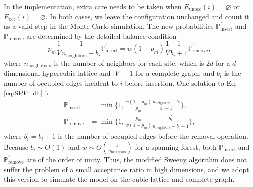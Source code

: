 In the implementation, extra care needs to be taken when $E_{\text{unocc}}(i) = \varnothing$ or $E_{\text{occ}}(i) = \varnothing$.
In both cases, we leave the configuration unchanged and count it as a valid step in the Monte Carlo simulation.
The new probabilities $\mathbb{P}^\prime_{\text{insert}}$ and $\mathbb{P}^\prime_{\text{remove}}$ are determined by the 
detailed balance condition
\begin{equation}\label{eq:SPF_db}
  p_m \frac{1}{V} \frac{1}{n_{\text{neighbors}}  - b_i} \mathbb{P}^\prime_{\text{insert}} =
  w (1-p_m) \frac{1}{V} \frac{1}{b_i+1} \mathbb{P}^\prime_{\text{remove}},
\end{equation}
where $n_{\text{neighobors}}$ is the number of neighbors for each site, which is $2d$ for a $d$-dimensional hypercubic
lattice and $|V|-1$ for a complete graph, and $b_i$ is the number of occupied edges incident to $i$ before insertion. 
One solution to Eq.\eqref{eq:SPF_db} is
\begin{equation}
\begin{aligned}
\mathbb{P}^\prime_{\text{insert}}  &= \min\{1, \frac{w(1-p_m)}{p_m}\frac{n_{\text{neighbors}}-b_i}{b_i+1}\}, \\
\mathbb{P}^\prime_{\text{remove}}  &= \min\{1, \frac{p_m}{w(1-p_m)}\frac{b_i^{\prime}}{n_{\text{neighbors}}-b_i^{\prime}+1}\},
\end{aligned}
\end{equation}
where $b^\prime_i = b_i + 1$ is the number of occupied edges before the removal operation. Because $b_i \sim O(1)$ and $w\sim O(\frac{1}{n_{\text{neighbors}}})$
for a spanning forest, both $\mathbb{P}^\prime_{\text{insert}}$ and $\mathbb{P}^\prime_{\text{remove}}$ are of the order of unity.
Thus, the modified Sweeny algorithm does not suffer the problem of a small acceptance ratio in high dimensions, and we adopt this version
to simulate the model on the cubic lattice and complete graph.





